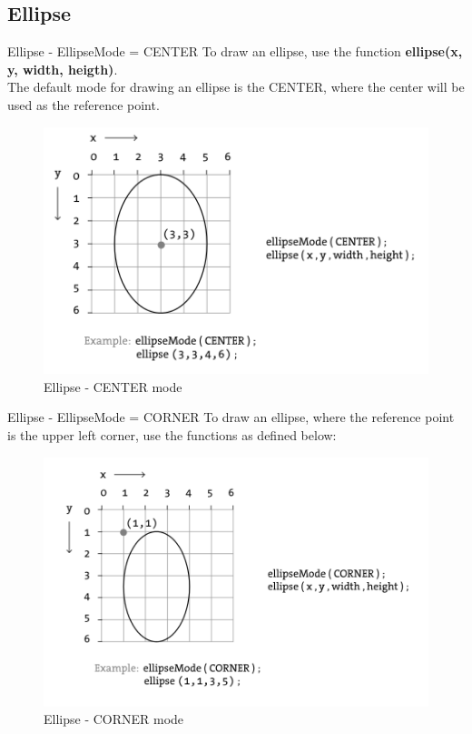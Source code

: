 \documentclass{beamer}
\begin{document}
\subsection{Ellipse}

\begin{frame}{Ellipse - EllipseMode = CENTER}
To draw an ellipse, use the function \textbf{ellipse(x, y, width, heigth)}.\\
The default mode for drawing an ellipse is the CENTER, where the center will
be used as the reference point.\\

\begin{figure}[H]
\centerline{\includegraphics[scale=0.5]{ellipse_center_mode.png}}
\caption{Ellipse - CENTER mode}
\end{figure}
\end{frame}

\begin{frame}{Ellipse - EllipseMode = CORNER}
To draw an ellipse, where the reference point is the upper left corner, use
the functions as defined below:\\

\begin{figure}[H]
\centerline{\includegraphics[scale=0.5]{ellipse_corner_mode.png}}
\caption{Ellipse - CORNER mode}
\end{figure}
\end{frame}
\end{document}
